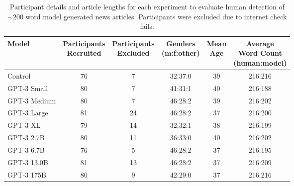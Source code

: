 \begin{table}
    \begin{center}
        \begin{tabular}{l c c c c c}
        \toprule
        Model & \shortstack{Participants\\Recruited}  & \shortstack{Participants\\Excluded} & \shortstack{Genders\\(m:f:other)} & \shortstack{Mean\\Age} & \shortstack{Average\\Word Count\\(human:model)} \\ 
        \midrule
        Control  & 76 & 7 & 32:37:0 & 39 & 216:216 \\ 
        GPT-3 Small  & 80 & 7  & 41:31:1 & 40 & 216:188 \\ 
        GPT-3 Medium  & 80 & 7  & 46:28:2  & 39 & 216:202 \\ 
        GPT-3 Large  & 81 & 24  & 46:28:2  & 37 & 216:200 \\ 
        GPT-3 XL  & 79 & 14  & 32:32:1  & 38 & 216:199 \\ 
        GPT-3 2.7B  & 80 & 11  & 36:33:0  & 40 & 216:202 \\ 
        GPT-3 6.7B  & 76 & 5  & 46:28:2  & 37 & 216:195 \\ 
        GPT-3 13.0B  & 81 & 13  & 46:28:2  & 37 & 216:209 \\ 
        GPT-3 175B & 80 & 9  & 42:29:0 &  37 & 216:216 \\ 
        \bottomrule
        \end{tabular}
    \end{center}
    \caption{Participant details and  article lengths for each experiment to evaluate human detection of $\sim200$ word model generated news articles. Participants were excluded due to internet check fails.}
    \label{table:study}
\end{table}